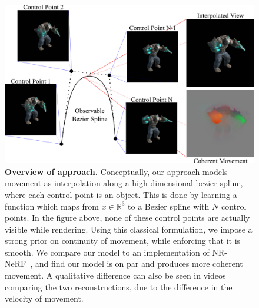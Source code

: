 \documentclass[runningheads]{llncs}
\begin{document}
\begin{figure}[!ht]
    \centering
    \includegraphics[width=\textwidth]{teaser}
    \caption{
    \label{fig:intro_figure}
    \textbf{Overview of approach.} Conceptually, our approach models movement as interpolation along a high-dimensional bezier spline, where each control point is an object. This is done by learning a function which maps from $x\in\mathbb{R}^3$ to a Bezier spline with $N$ control points. In the figure above, none of these control points are actually visible while rendering. Using this classical formulation, we impose a strong prior on continuity of movement, while enforcing that it is smooth. We compare our model to an implementation of NR-NeRF~\cite{tretschk2021nonrigid}, and find our model is on par and produces more coherent movement. A qualitative difference can also be seen in videos comparing the two reconstructions, due to the difference in the velocity of movement.
    }
    \vspace{-3mm}
\end{figure}








{\small
    
    
}
\end{document}
